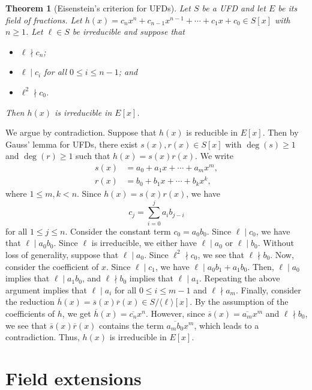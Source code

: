 \documentclass[10pt]{article}
\makeatletter
\theoremstyle{newstyle}
\newtheorem{thm}{Theorem}[section]
\newenvironment{pf}[1][\proofname]{\par
  \pushQED{\qed}%
  \normalfont \topsep0\p@\relax
  \trivlist
  \item[\hskip\labelsep\scshape
  #1\@addpunct{.}]\ignorespaces
}{%
  \popQED\endtrivlist\@endpefalse
}
\makeatother
\begin{document}
\begin{thm}[Eisenstein's criterion for UFDs]
Let $S$ be a UFD and let $E$ be its field of fractions. Let $h(x) = c_n x^n + 
c_{n-1} x^{n-1} + \cdots + c_1x + c_0 \in S[x]$ with $n \geq 1$. Let $\ell \in S$ be irreducible 
and suppose that
\begin{itemize}
    \item $\ell \nmid c_n$;
    \item $\ell \mid c_i$ for all $0 \leq i \leq n-1$; and 
    \item $\ell^2 \nmid c_0$.
\end{itemize}
Then $h(x)$ is irreducible in $E[x]$.
\end{thm}
\begin{pf}
We argue by contradiction. Suppose that $h(x)$ is reducible in $E[x]$. Then by 
Gauss' lemma for UFDs, there exist $s(x), r(x) \in S[x]$ with $\deg(s) \geq 1$ and 
$\deg(r) \geq 1$ such that $h(x) = s(x)r(x)$. We write 
\begin{align*}
    s(x) &= a_0 + a_1x + \cdots + a_m x^m, \\
    r(x) &= b_0 + b_1x + \cdots + b_k x^k,
\end{align*}
where $1 \leq m, k < n$. Since $h(x) = s(x)r(x)$, we have 
\[ c_j = \sum_{i=0}^j a_i b_{j-i} \]
for all $1 \leq j \leq n$. Consider the constant term $c_0 = a_0 b_0$. Since 
$\ell \mid c_0$, we have that $\ell \mid a_0 b_0$. Since $\ell$ is irreducible, 
we either have $\ell \mid a_0$ or $\ell \mid b_0$. Without loss of generality, 
suppose that $\ell \mid a_0$. Since $\ell^2 \nmid c_0$, we see that 
$\ell \nmid b_0$. Now, consider the coefficient of $x$. Since $\ell \mid c_1$, we have 
$\ell \mid a_0b_1 + a_1b_0$. Then, $\ell \mid a_0$ implies that $\ell \mid a_1b_0$, and 
$\ell \nmid b_0$ implies that $\ell \mid a_1$. Repeating the above argument implies that 
$\ell \mid a_i$ for all $0 \leq i \leq m-1$ and $\ell \nmid a_m$. Finally, 
consider the reduction $\overline{h}(x) = \overline{s}(x) \overline{r}(x) \in 
S/\langle\ell\rangle[x]$. By the assumption of the coefficients of $h$, we get 
$\overline{h}(x) = \overline{c_n}x^n$. However, since $\overline{s}(x) = \overline{a_m}x^m$ 
and $\ell \nmid b_0$, we see that $\overline{s}(x) \overline{r}(x)$ contains the term 
$\overline{a_m b_0} x^m$, which leads to a contradiction. Thus, $h(x)$ is irreducible in $E[x]$.
\end{pf}

\newpage
\section{Field extensions}
\end{document}

